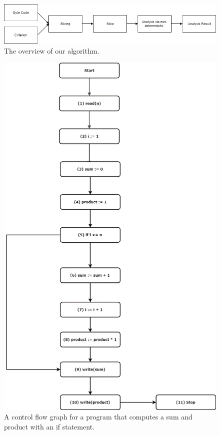 \documentclass[peerreview]{IEEEtran}
\begin{document}
\begin{figure}[!h]
\centering
\includegraphics[width=0.8\columnwidth]{ProjectOverview} 
\caption{The overview of our algorithm.}
\label{fig_sim}
\end{figure}

\begin{figure}[!h]
\centering
\includegraphics[width=0.8\columnwidth]{CFGBefore} 
\caption{A control flow graph for a program that computes a sum and product with an if statement.}
\label{fig_sim}
\end{figure}
\end{document}

